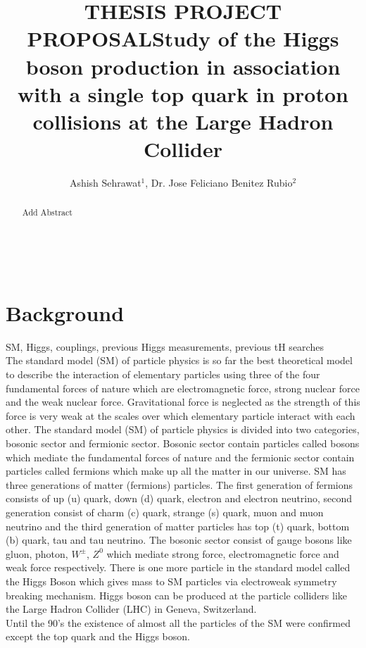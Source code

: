 \documentclass{article}
\date{}
\begin{document}
\title{THESIS PROJECT PROPOSAL}
\author{Ashish Sehrawat$^1$, Dr. Jose Feliciano Benitez Rubio$^2$}
 

\maketitle
\onehalfspacing \title{Study of the Higgs boson production in association with a single top quark in proton collisions at the Large Hadron Collider}\\
\address[mymainaddress]{Universidad de Sonora}
\begin{abstract}
Add Abstract
\end{abstract}

\section{Background}
 SM, Higgs, couplings, previous Higgs measurements, previous tH searches\\
\onehalfspacing The standard model (SM) of particle physics is so far the best theoretical model to describe the interaction of elementary 
particles using three of the four fundamental forces of nature which are electromagnetic force, strong nuclear force and the 
weak nuclear force. Gravitational force is neglected as the strength of this force is very weak at the scales over which 
elementary particle interact with each other. The standard model (SM) of particle physics is divided into two categories, 
bosonic sector and fermionic sector. Bosonic sector contain particles called bosons which mediate the fundamental forces of 
nature and the fermionic sector contain particles called fermions which make up all the matter in our universe. SM has three 
generations of matter (fermions) particles. The first generation of fermions consists of up (u) quark, down (d) quark, electron 
and electron neutrino, second generation consist of charm (c) quark, strange (s) quark, muon and muon neutrino and the third 
generation of matter particles has top (t) quark, bottom (b) quark, tau and tau neutrino. The bosonic sector consist of gauge 
bosons like gluon, photon, $W^{\pm}$, $Z^0$ which mediate strong force, electromagnetic force and weak force respectively. There is one more particle in the standard model called the Higgs Boson which gives mass to SM particles via electroweak symmetry breaking mechanism. Higgs boson can be produced at the particle colliders like the Large Hadron Collider (LHC) in Geneva, Switzerland. \\
Until the 90's the existence of almost all the particles of the SM were confirmed except the top quark and the Higgs boson. 
\end{document}
